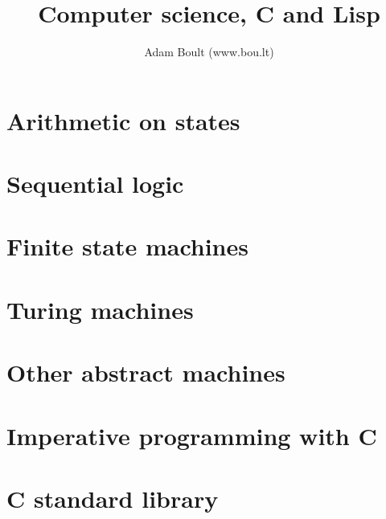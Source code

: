 \documentclass[oneside]{book}
\begin{document}
\author{Adam Boult (www.bou.lt)}
\title{Computer science, C and Lisp}
\maketitle

\setcounter{tocdepth}{0}
\tableofcontents



\part{Arithmetic on states}





\part{Sequential logic}



\part{Finite state machines}



\part{Turing machines}



\part{Other abstract machines}







\part{Imperative programming with C}











\part{C standard library}
\end{document}

